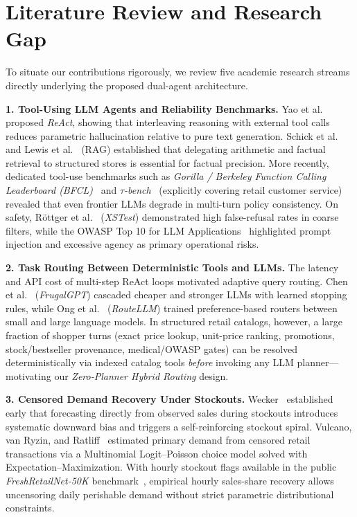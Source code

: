 \section{Literature Review and Research Gap}

To situate our contributions rigorously, we review five academic research streams directly underlying the proposed dual-agent architecture.

\textbf{1. Tool-Using LLM Agents and Reliability Benchmarks.}
Yao et al.~\cite{yao2023react} proposed \emph{ReAct}, showing that interleaving reasoning with external tool calls reduces parametric hallucination relative to pure text generation. Schick et al.~\cite{schick2023toolformer} and Lewis et al.~\cite{lewis2020rag} (RAG) established that delegating arithmetic and factual retrieval to structured stores is essential for factual precision. More recently, dedicated tool-use benchmarks such as \emph{Gorilla / Berkeley Function Calling Leaderboard (BFCL)}~\cite{patil2024gorilla} and \emph{$\tau$-bench}~\cite{yao2024taubench} (explicitly covering retail customer service) revealed that even frontier LLMs degrade in multi-turn policy consistency. On safety, Röttger et al.~\cite{rottger2024xstest} (\emph{XSTest}) demonstrated high false-refusal rates in coarse filters, while the OWASP Top 10 for LLM Applications~\cite{owasp_llm} highlighted prompt injection and excessive agency as primary operational risks.

\textbf{2. Task Routing Between Deterministic Tools and LLMs.}
The latency and API cost of multi-step ReAct loops motivated adaptive query routing. Chen et al.~\cite{chen2023frugalgpt} (\emph{FrugalGPT}) cascaded cheaper and stronger LLMs with learned stopping rules, while Ong et al.~\cite{ong2024routellm} (\emph{RouteLLM}) trained preference-based routers between small and large language models. In structured retail catalogs, however, a large fraction of shopper turns (exact price lookup, unit-price ranking, promotions, stock/bestseller provenance, medical/OWASP gates) can be resolved deterministically via indexed catalog tools \emph{before} invoking any LLM planner---motivating our \emph{Zero-Planner Hybrid Routing} design.

\textbf{3. Censored Demand Recovery Under Stockouts.}
Wecker~\cite{wecker1978stockouts} established early that forecasting directly from observed sales during stockouts introduces systematic downward bias and triggers a self-reinforcing stockout spiral. Vulcano, van Ryzin, and Ratliff~\cite{vulcano2012primary} estimated primary demand from censored retail transactions via a Multinomial Logit--Poisson choice model solved with Expectation--Maximization. With hourly stockout flags available in the public \emph{FreshRetailNet-50K} benchmark~\cite{freshretailnet50k}, empirical hourly sales-share recovery allows uncensoring daily perishable demand without strict parametric distributional constraints.

